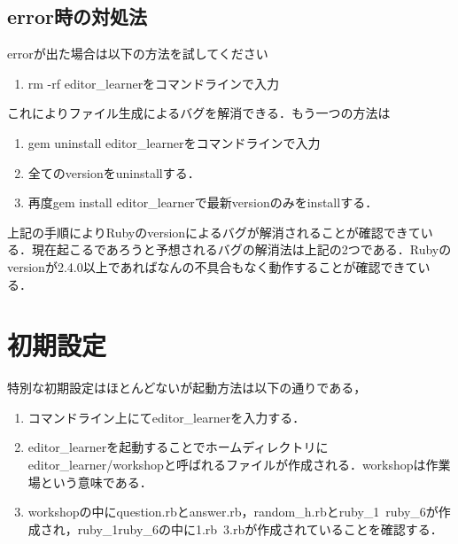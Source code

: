 \subsection{error時の対処法}\label{errorux6642ux306eux5bfeux51e6ux6cd5}

errorが出た場合は以下の方法を試してください

\begin{enumerate}
\def\labelenumi{\arabic{enumi}.}
\tightlist
\item
  rm -rf editor\_learnerをコマンドラインで入力
\end{enumerate}これによりファイル生成によるバグを解消できる．もう一つの方法は

\begin{enumerate}
\def\labelenumi{\arabic{enumi}.}
\tightlist
\item
  gem uninstall editor\_learnerをコマンドラインで入力
\item
  全てのversionをuninstallする．
\item
  再度gem install editor\_learnerで最新versionのみをinstallする．
\end{enumerate}
上記の手順によりRubyのversionによるバグが解消されることが確認できている．現在起こるであろうと予想されるバグの解消法は上記の2つである．Rubyのversionが2.4.0以上であればなんの不具合もなく動作することが確認できている．

    \section{初期設定}\label{ux521dux671fux8a2dux5b9a}

    特別な初期設定はほとんどないが起動方法は以下の通りである，

\begin{enumerate}
\def\labelenumi{\arabic{enumi}.}
\tightlist
\item
コマンドライン上にてeditor\_learnerを入力する．
\item
editor\_learnerを起動することでホームディレクトリにeditor\_learner/workshopと呼ばれるファイルが作成される．workshopは作業場という意味である．
\item
workshopの中にquestion.rbとanswer.rb，random\_h.rbとruby\_1~ruby\_6が作成され，ruby\_1ruby\_6の中に1.rb~3.rbが作成されていることを確認する．
\end{enumerate}

